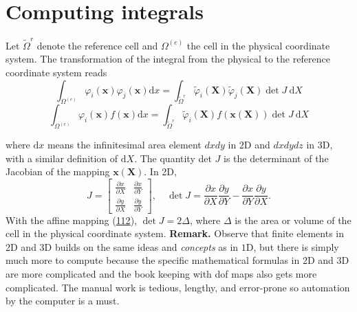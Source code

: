 \documentclass[../main.tex]{subfiles}
\begin{document}
	\section[Computing integrals]{Computing integrals}
	\label{sec:sec_9_5}
	Let $\tilde{\Omega}^{r}$ denote the reference cell and $\Omega^{(e)}$ the cell in the physical coordinate system. The transformation of the integral from the physical to the reference coordinate system reads
	\begin{equation}\label{eqa114}
		\int_{\Omega^{(e)}} \varphi_{i}(\boldsymbol{x}) \varphi_{j}(\boldsymbol{x}) \mathrm{d} x =\int_{\tilde{\Omega}^{r}} \tilde{\varphi}_{i}(\boldsymbol{X}) \tilde{\varphi}_{j}(\boldsymbol{X}) \operatorname{det} J \mathrm{~d} X
	\end{equation}
	\begin{equation}\label{eqa115}
		\int_{\Omega^{(e)}} \varphi_{i}(\boldsymbol{x}) f(\boldsymbol{x}) \mathrm{d} x =\int_{\tilde{\Omega}^{r}} \tilde{\varphi}_{i}(\boldsymbol{X}) f(\boldsymbol{x}(\boldsymbol{X})) \operatorname{det} J \mathrm{~d} X
	\end{equation}
	
	\noindent where $\mathrm{d} x$ means the infinitesimal area element $d x d y$ in $2 \mathrm{D}$ and $d x d y d z$ in 3D, with a similar definition of $\mathrm{d} X$. The quantity det $J$ is the determinant of the Jacobian of the mapping $\boldsymbol{x}(\boldsymbol{X})$. In 2D,
	\begin{equation}\label{eqa116}
		J=\left[\begin{array}{ll}
			\frac{\partial x}{\partial X} & \frac{\partial x}{\partial Y} \\
			\frac{\partial y}{\partial X} & \frac{\partial y}{\partial Y}
		\end{array}\right], \quad \operatorname{det} J=\frac{\partial x}{\partial X} \frac{\partial y}{\partial Y}-\frac{\partial x}{\partial Y} \frac{\partial y}{\partial X} .
	\end{equation}
	With the affine mapping (\hyperref[eqa112]{112}), $\operatorname{det} J=2 \Delta$, where $\Delta$ is the area or volume of the cell in the physical coordinate system.
	\bigbreak
	\noindent \textbf{Remark.} Observe that finite elements in 2D and 3D builds on the same ideas and \textit{concepts} as in $1 \mathrm{D}$, but there is simply much more to compute because the specific mathematical formulas in 2D and $3 \mathrm{D}$ are more complicated and the book keeping with dof maps also gets more complicated. The manual work is tedious, lengthy, and error-prone so automation by the computer is a must.
\clearpage
\end{document}
